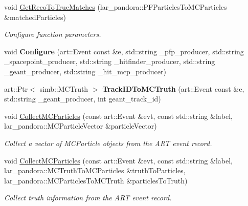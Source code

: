 \begin{DoxyCompactItemize}
\item 
void \hyperlink{group__lee_gaedec8759b64e578d4d27e4dd57bc2111}{Get\-Reco\-To\-True\-Matches} (lar\-\_\-pandora\-::\-P\-F\-Particles\-To\-M\-C\-Particles \&matched\-Particles)
\begin{DoxyCompactList}\small\item\em Configure function parameters. \end{DoxyCompactList}\item 
\hypertarget{group__lee_gacea920f6926b69221a6a04d17e38cbf9}{void {\bfseries Configure} (art\-::\-Event const \&e, std\-::string \-\_\-pfp\-\_\-producer, std\-::string \-\_\-spacepoint\-\_\-producer, std\-::string \-\_\-hitfinder\-\_\-producer, std\-::string \-\_\-geant\-\_\-producer, std\-::string \-\_\-hit\-\_\-mcp\-\_\-producer)}\label{group__lee_gacea920f6926b69221a6a04d17e38cbf9}

\item 
\hypertarget{group__lee_gaab1841058478f2ef51067eeb588d1711}{art\-::\-Ptr$<$ simb\-::\-M\-C\-Truth $>$ {\bfseries Track\-I\-D\-To\-M\-C\-Truth} (art\-::\-Event const \&e, std\-::string \-\_\-geant\-\_\-producer, int geant\-\_\-track\-\_\-id)}\label{group__lee_gaab1841058478f2ef51067eeb588d1711}

\item 
void \hyperlink{group__lee_ga3a9ecae08d8a56e37cc9ef723eca6907}{Collect\-M\-C\-Particles} (const art\-::\-Event \&evt, const std\-::string \&label, lar\-\_\-pandora\-::\-M\-C\-Particle\-Vector \&particle\-Vector)
\begin{DoxyCompactList}\small\item\em Collect a vector of M\-C\-Particle objects from the A\-R\-T event record. \end{DoxyCompactList}\item 
void \hyperlink{group__lee_ga2c7126fa2d3a506830f25ccad4fa0b3c}{Collect\-M\-C\-Particles} (const art\-::\-Event \&evt, const std\-::string \&label, lar\-\_\-pandora\-::\-M\-C\-Truth\-To\-M\-C\-Particles \&truth\-To\-Particles, lar\-\_\-pandora\-::\-M\-C\-Particles\-To\-M\-C\-Truth \&particles\-To\-Truth)
\begin{DoxyCompactList}\small\item\em Collect truth information from the A\-R\-T event record. \end{DoxyCompactList}\end{DoxyCompactItemize}
